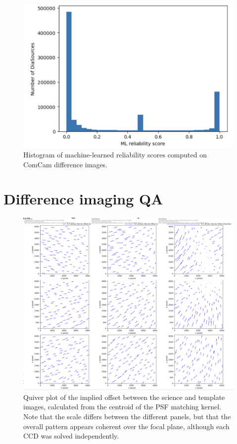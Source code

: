 \begin{figure}
\includegraphics[width=\textwidth]{dia/figures/reliability_histogram.png}
\caption{Histogram of machine-learned reliability scores computed on ComCam difference images. \label{fig:reliability_hist}}
\end{figure}

\section{Difference imaging QA}

\begin{figure}
\includegraphics[width=\textwidth]{dia/figures/DiffimKernelQuiverPlot-3x3}
\caption{Quiver plot of the implied offset between the science and template images,
  calculated from the centroid of the PSF matching kernel.
  Note that the scale differs between the different panels, but that the overall pattern
  appears coherent over the focal plane, although each CCD was solved independently.
  \label{fig:diffim-quiver}}
\end{figure}

